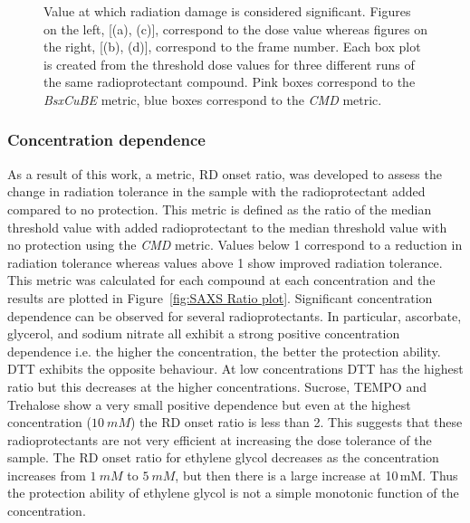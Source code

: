 \begin{figure}
\begin{subfigure}[b]{0.45\textwidth}
            \caption{}
            \label{fig:SAXS frame- 10mM}
    \end{subfigure}
    \caption{Value at which radiation damage is considered significant. Figures on the left, [(a), (c)], correspond to the dose value whereas figures on the right, [(b), (d)], correspond to the frame number. Each box plot is created from the threshold dose values for three different runs of the same radioprotectant compound. Pink boxes correspond to the \textit{BsxCuBE} metric, blue boxes correspond to the \textit{CMD} metric.}
    \label{fig:SAXS dose vs frame}
\end{figure}

\subsubsection{Concentration dependence}
\label{subs:Concentration dependence}
As a result of this work, a metric, RD onset ratio, was developed to assess the change in radiation tolerance in the sample with the radioprotectant added compared to no protection.
This metric is defined as the ratio of the median threshold value with added radioprotectant to the median threshold value with no protection using the \textit{CMD} metric.
Values below 1 correspond to a reduction in radiation tolerance whereas values above 1 show improved radiation tolerance.
This metric was calculated for each compound at each concentration and the results are plotted in Figure~\ref{fig:SAXS Ratio plot}.
Significant concentration dependence can be observed for several radioprotectants.
In particular, ascorbate, glycerol, and sodium nitrate all exhibit a strong positive concentration dependence i.e. the higher the concentration, the better the protection ability.
DTT exhibits the opposite behaviour.
At low concentrations DTT has the highest ratio but this decreases at the higher concentrations.
Sucrose, TEMPO and Trehalose show a very small positive dependence but even at the highest concentration ($10\ mM$) the RD onset ratio is less than 2.
This suggests that these radioprotectants are not very efficient at increasing the dose tolerance of the sample.
The RD onset ratio for ethylene glycol decreases as the concentration increases from $1\ mM$ to $5\ mM$, but then there is a large increase at 10$\,$mM.
Thus the protection ability of ethylene glycol is not a simple monotonic function of the concentration.
